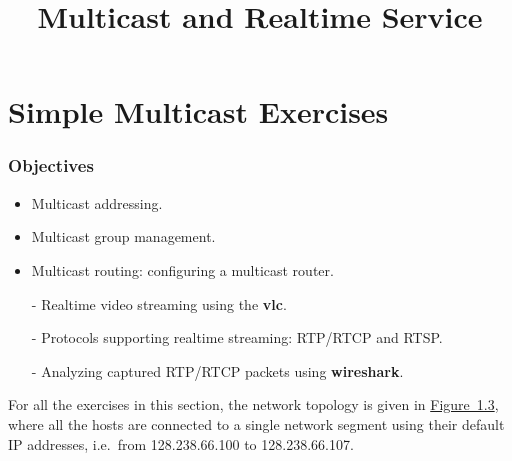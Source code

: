 \documentclass{../UTNetLab}
\title{Multicast and Realtime Service}
\begin{document}
\part{Simple Multicast Exercises}\label{sec:simple-multicast}

\section*{Objectives}
\begin{itemize}
    \item Multicast addressing.
    \item Multicast group management.
    \item Multicast routing: configuring a multicast router.
    \item [-] Realtime video streaming using the \textbf{vlc}.
    \item [-] Protocols supporting realtime streaming: RTP/RTCP and RTSP.
    \item [-] Analyzing captured RTP/RTCP packets using \textbf{wireshark}.
\end{itemize}

For all the exercises in this section, the network topology is given in \hyperref[fig:1.3]{Figure~1.3}, where all the hosts are connected to a single network segment using their default IP addresses, i.e.\ from 128.238.66.100 to 128.238.66.107.
\end{document}
